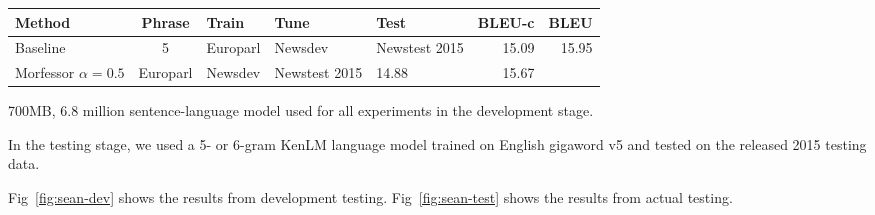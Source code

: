 \begin{figure*}
    \begin{center}
        \begin{tabular}{lclllrr}
            \hline
            \textbf{Method} & \textbf{Phrase} & \textbf{Train} & \textbf{Tune} &
            \textbf{Test} & \textbf{BLEU-c} & \textbf{BLEU} \\
            \hline
            Baseline & 5 & Europarl & Newsdev & Newstest 2015 &
            15.09 & 15.95 \\
            Morfessor $\alpha=0.5$ & Europarl & Newsdev & Newstest 2015 &
            14.88 & 15.67 \\
            \hline
        \end{tabular}
    \caption{Results from the testing stage with Newstest2015 testing data.}
    \label{fig:sean-test}
    \end{center}
\end{figure*}

700MB, 6.8 million sentence-language model used for all experiments in the
development stage.

In the testing stage, we used a 5- or 6-gram KenLM language model trained on
English gigaword v5 and tested on the released 2015 testing data.

Fig~\ref{fig:sean-dev} shows the results from development testing.
Fig~\ref{fig:sean-test} shows the results from actual testing.
